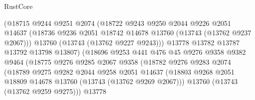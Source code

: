 \begin{lexlean}{RustCore}
\begin{coremodule}
                              (@18715
                                @9244
                                @9251
                                @2074
                                (@18722
                                  @9243
                                  @9250
                                  @2044
                                  @9226
                                  @2051
                                  @14637
                                  (@18736
                                    @9236
                                    @2051
                                    @18742
                                    @14678
                                    @13760
                                    (@13743 (@13762 @9237 @2067)))
                                  @13760
                                  (@13743 (@13762 @9227 @9243)))
                                @13778
                                @13782
                                @13787
                                @13792
                                @13798
                                @13807)
                              (@18696
                                @9253
                                @441
                                @476
                                @45
                                @9276
                                @9358
                                @9382
                                @9464
                                (@18775
                                  @9276
                                  @9285
                                  @2067
                                  @9358
                                  (@18782
                                    @9276
                                    @9283
                                    @2074
                                    (@18789
                                      @9275
                                      @9282
                                      @2044
                                      @9258
                                      @2051
                                      @14637
                                      (@18803
                                        @9268
                                        @2051
                                        @18809
                                        @14678
                                        @13760
                                        (@13743 (@13762 @9269 @2067)))
                                      @13760
                                      (@13743 (@13762 @9259 @9275)))
                                    @13778

\end{coremodule}
\end{lexlean}
